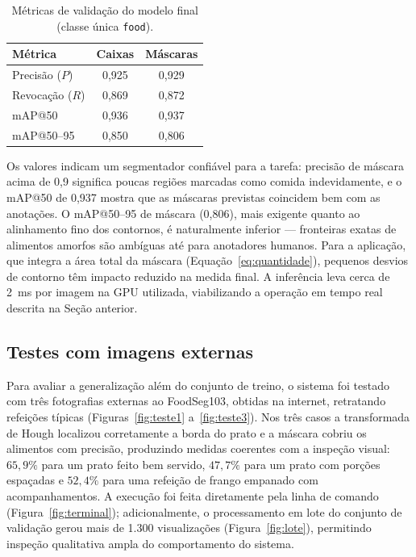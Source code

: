 \documentclass[12pt,a4paper]{article}
\begin{document}
\begin{table}[H]
  \centering
  \caption{Métricas de validação do modelo final (classe única \texttt{food}).}
  \label{tab:metricas}
  \begin{tabular}{lcc}
    \toprule
    Métrica & Caixas & Máscaras \\
    \midrule
    Precisão ($P$)          & 0{,}925 & 0{,}929 \\
    Revocação ($R$)         & 0{,}869 & 0{,}872 \\
    mAP@50                  & 0{,}936 & 0{,}937 \\
    mAP@50--95              & 0{,}850 & 0{,}806 \\
    \bottomrule
  \end{tabular}
\end{table}

Os valores indicam um segmentador confiável para a tarefa: precisão de máscara acima de 0,9
significa poucas regiões marcadas como comida indevidamente, e o mAP@50 de 0,937 mostra que as
máscaras previstas coincidem bem com as anotações. O mAP@50--95 de máscara (0,806), mais
exigente quanto ao alinhamento fino dos contornos, é naturalmente inferior --- fronteiras
exatas de alimentos amorfos são ambíguas até para anotadores humanos. Para a aplicação, que
integra a área total da máscara (Equação~\eqref{eq:quantidade}), pequenos desvios de contorno
têm impacto reduzido na medida final. A inferência leva cerca de 2~ms por imagem na GPU
utilizada, viabilizando a operação em tempo real descrita na Seção anterior.

\subsection{Testes com imagens externas}

Para avaliar a generalização além do conjunto de treino, o sistema foi testado com três
fotografias externas ao FoodSeg103, obtidas na internet, retratando refeições típicas
(Figuras~\ref{fig:teste1} a~\ref{fig:teste3}). Nos três casos a transformada de Hough
localizou corretamente a borda do prato e a máscara cobriu os alimentos com precisão,
produzindo medidas coerentes com a inspeção visual: $65{,}9\%$ para um prato feito bem
servido, $47{,}7\%$ para um prato com porções espaçadas e $52{,}4\%$ para uma refeição de
frango empanado com acompanhamentos. A execução foi feita diretamente pela linha de comando
(Figura~\ref{fig:terminal}); adicionalmente, o processamento em lote do conjunto de validação
gerou mais de 1.300 visualizações (Figura~\ref{fig:lote}), permitindo inspeção qualitativa
ampla do comportamento do sistema.
\end{document}
